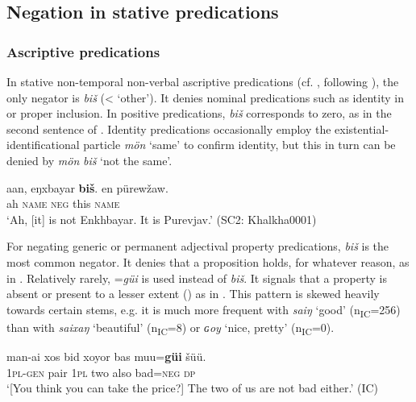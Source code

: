 \documentclass[output=paper,colorlinks,citecolor=brown,chinesefont]{langscibook}
\begin{document}
 
\subsection{Negation in stative predications}\label{sec:kha:2.3}
\subsubsection{Ascriptive predications} \label{sec:kha:2.3.1}

In stative non-temporal non-verbal ascriptive predications (cf. \citealt[110--111]{Veselinova2013neg.exist}, following \citealt{Hengeveld1992}), the only negator is \textit{biš} (< ‘other’). It denies nominal predications such as identity in  or proper inclusion. In positive predications, \textit{biš} corresponds to zero, as in the second sentence of . Identity predications occasionally employ the existential-identificational particle \textit{mön} ‘same’ to confirm identity, but this in turn can be denied by \textit{mön} \textit{biš} ‘not the same’.

\ea\label{ex:kha:22}
    \gll aan, eŋxbayar \textbf{biš}. en pürewžaw. \\ 
         ah \textsc{name} \textsc{neg} this \textsc{name} \\
    \glt ‘Ah, [it] is not Enkhbayar. It is Purevjav.’ (SC2: Khalkha0001)
\z 

For negating generic or permanent adjectival property predications, \textit{biš} is the most common negator. It denies that a proposition holds, for whatever reason, as in . Relatively rarely, =\textit{güi} is used instead of \textit{biš}. It signals that a property is absent or present to a lesser extent (\citealt[43]{Sarangguua2007}) as in . This pattern is skewed heavily towards certain stems, e.g. it is much more frequent with \textit{saiŋ} ‘good’ (n\textsubscript{IC}=256) than with \textit{saixaŋ} ‘beautiful’ (n\textsubscript{IC}=8) or \textit{ɢoy} ‘nice, pretty’ (n\textsubscript{IC}=0).

\ea\label{ex:kha:24}
    \gll man-ai xos bid xoyor bas muu=\textbf{güi} šüü.  \\ 
         \textsc{1pl-gen} pair \textsc{1pl}   two also bad=\textsc{neg} \textsc{dp} \\
    \glt ‘[You think you can take the price?] The two of us are not bad either.’ (IC)
\z 
\end{document}
